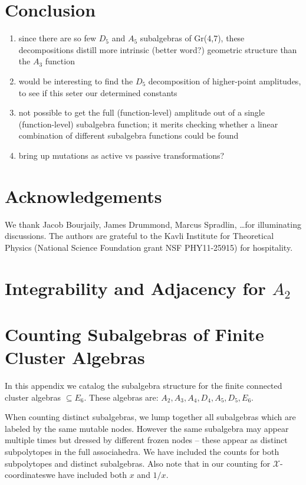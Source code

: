 \documentclass[11pt]{article}
\def\xcoords{$\mathcal{X}$-coordinates}
\def\pdfeq#1{\texorpdfstring{$#1$}{a}}
\begin{document}
\section{Conclusion}

\begin{enumerate}
\item since there are so few $D_5$ and $A_5$ subalgebras of Gr(4,7), these decompositions distill more intrinsic (better word?) geometric structure than the $A_3$ function 
\item would be interesting to find the $D_5$ decomposition of higher-point amplitudes, to see if this seter our determined constants
\item not possible to get the full (function-level) amplitude out of a single (function-level) subalgebra function; it merits checking whether a linear combination of different subalgebra functions could be found
\item bring up mutations as active vs passive transformations?
\end{enumerate}

\section*{Acknowledgements}

We thank Jacob Bourjaily, James Drummond, Marcus Spradlin, \dots for illuminating discussions. The authors are grateful to the Kavli Institute for Theoretical Physics (National Science Foundation grant NSF PHY11-25915) for hospitality. 


\appendix

\section{Integrability and Adjacency for \pdfeq{A_2}}  \label{appendix:integrable_A2}

\section{Counting Subalgebras of Finite Cluster Algebras}\label{appendix:subalgebras}
In this appendix we catalog the subalgebra structure for the finite connected cluster algebras \(\subseteq E_6\). These algebras are: \(A_2, A_3, A_4, D_4, A_5, D_5, E_6\).

When counting distinct subalgebras, we lump together all subalgebras which are labeled by the same mutable nodes. However the same subalgebra may appear multiple times but dressed by different frozen nodes -- these appear as distinct subpolytopes in the full associahedra. We have included the counts for both subpolytopes and distinct subalgebras. Also note that in our counting for \xcoords we have included both $x$ and $1/x$.\\ 
\end{document}
